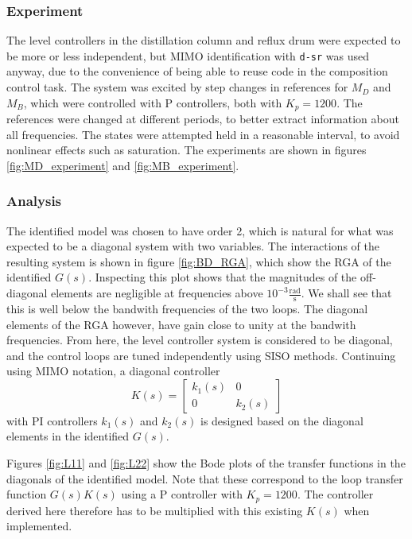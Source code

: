 \documentclass[12pt]{article}
\begin{document}
\subsubsection{Experiment}
The level controllers in the distillation column and reflux drum were expected to be more or less independent, but MIMO identification with \texttt{d-sr} was used anyway, due to the convenience of being able to reuse code in the composition control task. The system was excited by step changes in references for $M_D$ and $M_B$, which were controlled with P controllers, both with $K_p = 1200$. The references were changed at different periods, to better extract information about all frequencies. The states were attempted held in a reasonable interval, to avoid nonlinear effects such as saturation. The experiments are shown in figures \ref{fig:MD_experiment} and \ref{fig:MB_experiment}.

\subsubsection{Analysis}
The identified model was chosen to have order 2, which is natural for what was expected to be a diagonal system with two variables. The interactions of the resulting system is shown in figure \ref{fig:BD_RGA}, which show the RGA of the identified $G(s)$. Inspecting this plot shows that the magnitudes of the off-diagonal elements are negligible at frequencies above $10^{-3} \frac{\textrm{rad}}{\textrm{s}}$. We shall see that this is well below the bandwith frequencies of the two loops. The diagonal elements of the RGA however, have gain close to unity at the bandwith frequencies. From here, the level controller system is considered to be diagonal, and the control loops are tuned independently using SISO methods. Continuing using MIMO notation, a diagonal controller
\begin{equation}
K(s) =
\begin{bmatrix}
k_1(s) & 0\\
0 & k_2(s)
\end{bmatrix}
\end{equation}
with PI controllers $k_1(s)$ and $k_2(s)$ is designed based on the diagonal elements in the identified $G(s)$.

Figures \ref{fig:L11} and \ref{fig:L22} show the Bode plots of the transfer functions in the diagonals of the identified model. Note that these correspond to the loop transfer function $G(s) K(s)$ using a P controller with $K_p = 1200$. The controller derived here therefore has to be multiplied with this existing $K(s)$ when implemented.
\end{document}
